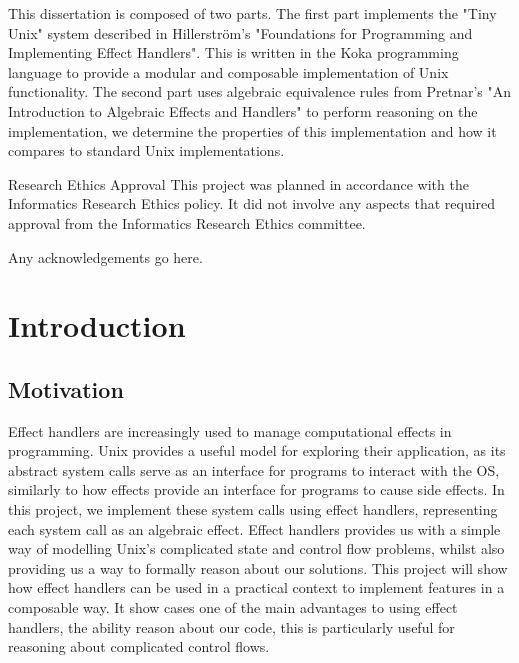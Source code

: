 \documentclass[logo,bsc,singlespacing,parskip]{infthesis}
\begin{document}
\begin{preliminary}
{This dissertation is composed of two parts. The first part implements the "Tiny Unix" system described in Hillerström's "Foundations for Programming and Implementing Effect Handlers". This is written in the Koka programming language to provide a modular and composable implementation of Unix functionality. The second part uses algebraic equivalence rules from Pretnar's "An Introduction to Algebraic Effects and Handlers" to perform reasoning on the implementation, we determine the properties of this implementation and how it compares to standard Unix implementations. 



}

\maketitle

\newenvironment{ethics}
   {\begin{frontenv}{Research Ethics Approval}{\LARGE}}
   {\end{frontenv}\newpage}

\begin{ethics}
This project was planned in accordance with the Informatics Research
Ethics policy. It did not involve any aspects that required approval
from the Informatics Research Ethics committee.

\standarddeclaration
\end{ethics}


\begin{acknowledgements}
Any acknowledgements go here.
\end{acknowledgements}


\tableofcontents
\end{preliminary}


\chapter{Introduction}
\section{Motivation}
Effect handlers are increasingly used to manage computational effects in programming. Unix provides a useful model for exploring their application, as its abstract system calls serve as an interface for programs to interact with the OS, similarly to how effects provide an interface for programs to cause side effects. In this project, we implement these system calls using effect handlers, representing each system call as an algebraic effect. Effect handlers provides us with a simple way of modelling Unix's complicated state and control flow problems, whilst also providing us a way to formally reason about our solutions. This project will show how effect handlers can be used in a practical context to implement features in a composable way. It show cases one of the main advantages to using effect handlers, the ability reason about our code, this is particularly useful for reasoning about complicated control flows. 
\end{document}
